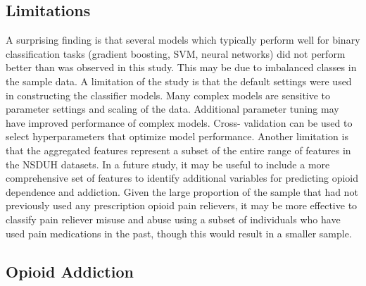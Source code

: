 \documentclass[sigconf]{acmart}
\begin{document}

\subsection{Limitations}

A surprising finding is that several models which typically perform well for 
binary classification tasks (gradient boosting, SVM, neural networks) did not 
perform better than was observed in this study. This may be due to imbalanced 
classes in the sample data. A limitation of the study is that the default 
settings were used in constructing the classifier models. Many complex models 
are sensitive to parameter settings and scaling of the data. Additional 
parameter tuning may have improved performance of complex models. Cross-
validation can be used to select hyperparameters that optimize model 
performance. Another limitation is that the aggregated features represent a 
subset of the entire range of features in the NSDUH datasets. In a future 
study, it may be useful to include a more comprehensive set of features to 
identify additional variables for predicting opioid dependence and addiction. 
Given the large proportion of the sample that had not previously used any
prescription opioid pain relievers, it may be more effective to classify 
pain reliever misuse and abuse using a subset of individuals who have used 
pain medications in the past, though this would result in a smaller sample.


\subsection{Opioid Addiction}
\end{document}
